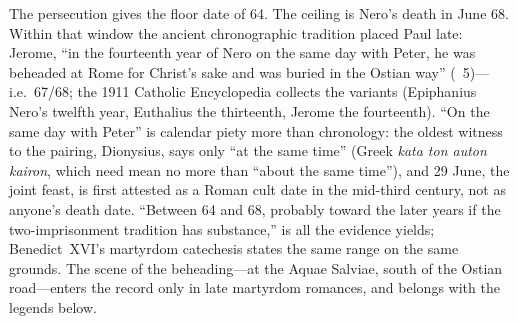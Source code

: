 The persecution gives the floor date of 64. The ceiling is Nero's death in
June 68. Within that window the ancient chronographic tradition placed
Paul late: Jerome, ``in the fourteenth year of Nero on the same day with
Peter, he was beheaded at Rome for Christ's sake and was buried in the
Ostian way'' (~5)---i.e.\ 67/68; the 1911
Catholic Encyclopedia collects the variants (Epiphanius Nero's twelfth
year, Euthalius the thirteenth, Jerome the fourteenth). ``On the same day
with Peter'' is calendar piety more than chronology: the oldest witness to
the pairing, Dionysius, says only ``at the same time'' (Greek \textit{kata
ton auton kairon}, which need mean no more than ``about the same time''),
and 29 June, the joint feast, is first attested as a Roman cult date in
the mid-third century, not as anyone's death date. ``Between 64 and 68,
probably toward the later years if the two-imprisonment tradition has
substance,'' is all the evidence yields; Benedict~XVI's martyrdom
catechesis states the same range on the same grounds. The scene of the
beheading---at the Aquae Salviae, south of the Ostian road---enters the
record only in late martyrdom romances, and belongs with the legends
below.
